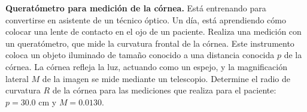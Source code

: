 \item \textbf{Queratómetro para medición de la córnea.}
Está entrenando para convertirse en asistente de un técnico óptico. Un día, está aprendiendo cómo colocar una lente de contacto en el ojo de un paciente. Realiza una medición con un queratómetro, que mide la curvatura frontal de la córnea. Este instrumento coloca un objeto iluminado de tamaño conocido a una distancia conocida $p$ de la córnea. La córnea refleja la luz, actuando como un espejo, y la magnificación lateral $M$ de la imagen se mide mediante un telescopio. Determine el radio de curvatura $R$ de la córnea para las mediciones que realiza para el paciente: $p = 30.0\text{ cm}$ y $M = 0.0130$.